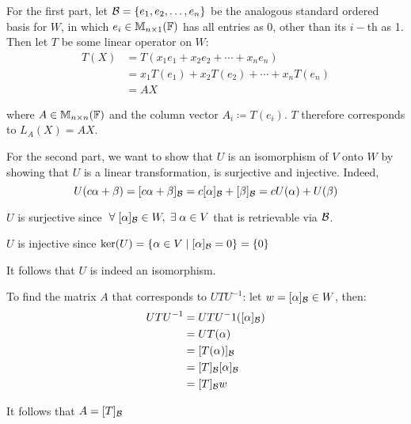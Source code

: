 \documentclass[a4paper, 10pt]{article}
\begin{document}
\begin{solution}
    For the first part, let \(\mathcal{B} = \{e_1, e_2, \dots, e_n\}\) be the analogous standard ordered basis for \(W\), in which \(e_i \in \mathbb{M}_{n \times 1}(\mathbb{F})\) has all entries as 0, other than its \(i-\)th as 1. Then let \(T\) be some linear operator on \(W\):
    \begin{align*}
        T(X) & = T(x_1 e_1 + x_2 e_2 + \cdots + x_n e_n)       \\
             & = x_1 T(e_1) + x_2 T(e_2) + \cdots + x_n T(e_n) \\
             & = AX
    \end{align*}

    where \(A \in \mathbb{M}_{n \times n}(\mathbb{F})\) and the column vector \(A_i \coloneqq T(e_i)\). \(T\) therefore corresponds to \(L_A(X) = AX\).

    For the second part, we want to show that \(U\) is an isomorphism of \(V\) onto \(W\) by showing that \(U\) is a linear transformation, is surjective and injective. Indeed, \[
        U(c\alpha + \beta) = [c\alpha+\beta]_{\mathcal{B}} = c[\alpha]_{\mathcal{B}} + [\beta]_{\mathcal{B}} = cU(\alpha) + U(\beta)
    \]

    \(U\) is surjective since \(\forall [\alpha]_\calb \in W, \exists \alpha \in V\) that is retrievable via \(\mathcal{B}\).

    \(U\) is injective since \(\ker(U) = \{\alpha \in V \mid [\alpha]_{\mathcal{B}} = 0\} = \{0\}\)

    It follows that \(U\) is indeed an isomorphism.

    To find the matrix \(A\) that corresponds to \(UTU^{-1}\): let \(w = [\alpha]_{\mathcal{B}} \in W\), then:
    \begin{align*}
        UTU^{-1} & = UTU^-1([\alpha]_{\mathcal{B}})  \\
                 & = UT(\alpha)             \\
                 & = [T(\alpha)]_{\mathcal{B}}       \\
                 & = [T]_{\mathcal{B}} [\alpha]_{\mathcal{B}} \\
                 & = [T]_{\mathcal{B}} w
    \end{align*}

    It follows that \(A = [T]_{\mathcal{B}}\)
\end{solution}
\end{document}
